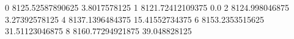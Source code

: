 0 8125.52587890625 3.8017578125
1 8121.72412109375 0.0
2 8124.998046875 3.27392578125
4 8137.1396484375 15.41552734375
6 8153.2353515625 31.51123046875
8 8160.77294921875 39.048828125
